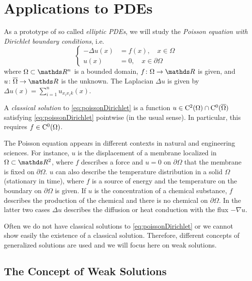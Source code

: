 \chapter{Applications to PDEs}
\label{chap:appsToPDEs}

As a prototype of so called \emph{elliptic PDEs}, we will study the \emph{Poisson equation with Dirichlet boundary conditions}, i.e.
\begin{equation}
  \label{eq:poissonDirichlet}
  \begin{cases}
    -\Delta u(x) &= f(x), \quad x \in \Omega \\
    u(x) &= 0, \quad x \in \partial\Omega
  \end{cases}
\end{equation}
where $\Omega \subset \R^n$ is a bounded domain, $f \colon \Omega \to \R$ is given, and $u \colon \overline \Omega \to \R$ is the unknown.
The Laplacian $\Delta u$ is given by $\Delta u(x) = \sum_{i = 1}^n u_{x_i x_ik}(x)$.

\begin{defn}
  A \emph{classical solution} to \eqref{eq:poissonDirichlet} is a function $u \in \mathrm{C}^2(\Omega) \cap \mathrm{C}^0(\overline\Omega)$ satisfying \eqref{eq:poissonDirichlet} pointwise (in the usual sense).
  In particular, this requires $f \in \mathrm{C}^0(\Omega)$.
\end{defn}

  The Poisson equation appears in different contexts in natural and engineering sciences.
  For instance, $u$ is the displacement of a membrane localized in $\Omega \subset \R^2$, where $f$ describes a force and $u = 0$ on $\partial\Omega$ that the membrane is fixed on $\partial\Omega$.
  $u$ can also describe the temperature distribution in a solid $\Omega$ (stationary in time), where $f$ is a source of energy and the temperature on the boundary on $\partial\Omega$ is given.
  If $u$ is the concentration of a chemical substance, $f$ describes the production of the chemical and there is no chemical on $\partial\Omega$.
  In the latter two cases $\Delta u$ describes the diffusion or heat conduction with the flux $-\nabla u$.

  Often we do not have classical solutions to \eqref{eq:poissonDirichlet} or we cannot show easily the existence of a classical solution.
  Therefore, different concepts of generalized solutions are used and we will focus here on weak solutions.

\section{The Concept of Weak Solutions}
\label{sec:weakSolutions}

